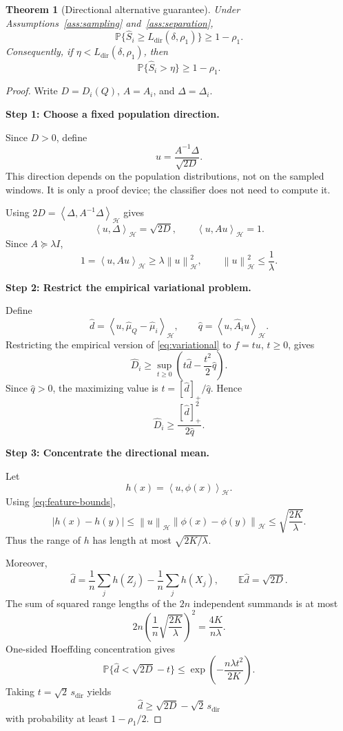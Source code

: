 \documentclass[11pt]{article}
\newcommand{\HH}{\mathcal H}
\newcommand{\E}{\mathbb E}
\newcommand{\Prob}{\mathbb P}
\newcommand{\inner}[2]{\left\langle #1,#2\right\rangle_{\HH}}
\newcommand{\norm}[1]{\left\lVert #1\right\rVert_{\HH}}
\newcommand{\proofstep}[1]{%
  \par\smallskip
  \noindent\textbf{#1}\enspace\ignorespaces
}
\newtheorem{theorem}{Theorem}
\begin{document}
\begin{theorem}[Directional alternative guarantee]
\label{thm:directional}
Under Assumptions~\ref{ass:sampling}
and~\ref{ass:separation},
\[
\Prob\{\widehat S_i\ge
L_{\mathrm{dir}}(\delta,\rho_1)\}\ge1-\rho_1.
\]
Consequently, if $\eta<L_{\mathrm{dir}}(\delta,\rho_1)$,
then
\[
\Prob\{\widehat S_i>\eta\}\ge1-\rho_1.
\]
\end{theorem}

\begin{proof}
Write $D=D_i(Q)$, $A=A_i$, and $\Delta=\Delta_i$.

\proofstep{Step 1: Choose a fixed population direction.}
Since $D>0$, define
\[
u=\frac{A^{-1}\Delta}{\sqrt{2D}}.
\]
This direction depends on the population distributions,
not on the sampled windows. It is only a proof device;
the classifier does not need to compute it.

Using $2D=\inner{\Delta}{A^{-1}\Delta}$ gives
\[
\inner{u}{\Delta}=\sqrt{2D},
\qquad
\inner{u}{Au}=1.
\]
Since $A\succeq\lambda I$,
\[
1=\inner{u}{Au}\ge\lambda\norm{u}^2,
\qquad
\norm{u}^2\le\frac1\lambda.
\]

\proofstep{Step 2: Restrict the empirical variational problem.}
Define
\[
\widehat d=\inner{u}{\widehat\mu_Q-\widehat\mu_i},
\qquad
\widehat q=\inner{u}{\widehat A_i u}.
\]
Restricting the empirical version of
\eqref{eq:variational} to $f=tu$, $t\ge0$, gives
\[
\widehat D_i
\ge
\sup_{t\ge0}
\left(t\widehat d-\frac{t^2}{2}\widehat q\right).
\]
Since $\widehat q>0$, the maximizing value is
$t=[\widehat d]_+/\widehat q$. Hence
\begin{equation}
\widehat D_i\ge\frac{[\widehat d]_+^2}{2\widehat q}.
\label{eq:directional-variational}
\end{equation}

\proofstep{Step 3: Concentrate the directional mean.}
Let
\[
h(x)=\inner{u}{\phi(x)}.
\]
Using \eqref{eq:feature-bounds},
\[
|h(x)-h(y)|
\le\norm{u}\norm{\phi(x)-\phi(y)}
\le\sqrt{\frac{2K}{\lambda}}.
\]
Thus the range of $h$ has length at most
$\sqrt{2K/\lambda}$.

Moreover,
\[
\widehat d
=\frac1n\sum_jh(Z_j)-\frac1n\sum_jh(X_j),
\qquad
\E\widehat d=\sqrt{2D}.
\]
The sum of squared range lengths of the $2n$ independent
summands is at most
\[
2n\left(\frac1n\sqrt{\frac{2K}{\lambda}}\right)^2
=\frac{4K}{n\lambda}.
\]
One-sided Hoeffding concentration gives
\[
\Prob\{\widehat d<\sqrt{2D}-t\}
\le\exp\left(-\frac{n\lambda t^2}{2K}\right).
\]
Taking $t=\sqrt2\,s_{\mathrm{dir}}$ yields
\[
\widehat d\ge\sqrt{2D}-\sqrt2\,s_{\mathrm{dir}}
\]
with probability at least $1-\rho_1/2$.


\end{proof}
\end{document}
